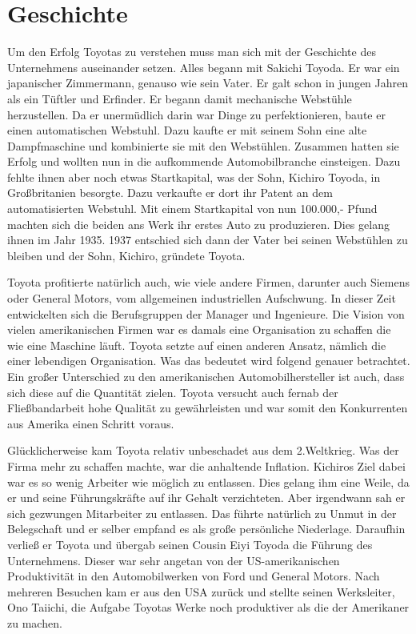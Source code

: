 \documentclass[a4paper,12pt]{scrartcl}
\begin{document}
\clearpage
\section{Geschichte}

    Um den Erfolg Toyotas zu verstehen muss man sich mit der Geschichte des Unternehmens auseinander setzen. Alles begann mit Sakichi Toyoda. Er war ein japanischer Zimmermann, genauso wie sein Vater. Er galt schon in jungen Jahren als ein Tüftler und Erfinder. Er begann damit mechanische Webstühle herzustellen. Da er unermüdlich darin war Dinge zu perfektionieren, baute er einen automatischen Webstuhl. Dazu kaufte er mit seinem Sohn eine alte Dampfmaschine und kombinierte sie mit den Webstühlen. Zusammen hatten sie Erfolg und wollten nun in die aufkommende Automobilbranche einsteigen. Dazu fehlte ihnen aber noch etwas Startkapital, was der Sohn, Kichiro Toyoda, in Großbritanien besorgte. Dazu verkaufte er dort ihr Patent an dem automatisierten Webstuhl. Mit einem Startkapital von nun 100.000,- Pfund machten sich die beiden ans Werk ihr erstes Auto zu produzieren. Dies gelang ihnen im Jahr 1935. 1937 entschied sich dann der Vater bei seinen Webstühlen zu bleiben und der Sohn, Kichiro, gründete Toyota. 
    
    Toyota profitierte natürlich auch, wie viele andere Firmen, darunter auch Siemens oder General Motors, vom allgemeinen industriellen Aufschwung. In dieser Zeit entwickelten sich die Berufsgruppen der Manager und Ingenieure. Die Vision von vielen amerikanischen Firmen war es damals eine Organisation zu schaffen die wie eine Maschine läuft. Toyota setzte auf einen anderen Ansatz, nämlich die einer lebendigen Organisation. Was das bedeutet wird folgend genauer betrachtet. Ein großer Unterschied zu den amerikanischen Automobilhersteller ist auch, dass sich diese auf die Quantität zielen. Toyota versucht auch fernab der Fließbandarbeit hohe Qualität zu gewährleisten und war somit den Konkurrenten aus Amerika einen Schritt voraus.
    
    Glücklicherweise kam Toyota relativ unbeschadet aus dem 2.Weltkrieg. Was der Firma mehr zu schaffen machte, war die anhaltende Inflation. Kichiros Ziel dabei war es so wenig Arbeiter wie möglich zu entlassen. Dies gelang ihm eine Weile, da er und seine Führungskräfte auf ihr Gehalt verzichteten. Aber irgendwann sah er sich gezwungen Mitarbeiter zu entlassen. Das führte natürlich zu Unmut in der Belegschaft und er selber empfand es als große persönliche Niederlage. Daraufhin verließ er Toyota und übergab seinen Cousin Eiyi Toyoda die Führung des Unternehmens. Dieser war sehr angetan von der US-amerikanischen Produktivität in den Automobilwerken von Ford und General Motors. Nach mehreren Besuchen kam er aus den USA zurück und stellte seinen Werksleiter, Ono Taiichi, die Aufgabe Toyotas Werke noch produktiver als die der Amerikaner zu machen.
    
\end{document}
